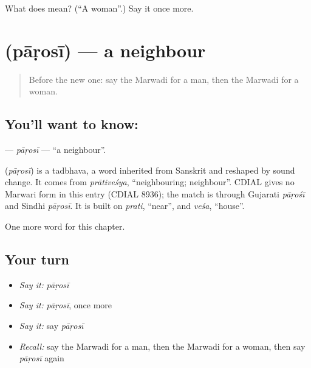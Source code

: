 \begin{tcolorbox}[breakable,colback=teal!4,colframe=teal!35!black,title={Before you move on}]
What does  mean? (\textquotedblleft{}A woman\textquotedblright{}.) Say it once more.
\end{tcolorbox}
\section[\texorpdfstring{\mw{पाड़ोसी} (pāṛosī)}{पाड़ोसी (pāṛosī)}]{ (pāṛosī) — a neighbour}

\label{lesson:MW-C50-parosi}



\begin{quote}
Before the new one: say the Marwadi for a man, then the Marwadi for a woman.
\end{quote}

\subsection*{You'll want to know: }
\textbf{} — \emph{pāṛosī} — \textquotedblleft{}a neighbour\textquotedblright{}.

\begin{cousinweb}
\textbf{} (\emph{pāṛosī}) is a tadbhava, a word inherited from Sanskrit and reshaped by sound change. It comes from \emph{prātiveśya}, \textquotedblleft{}neighbouring; neighbour\textquotedblright{}. CDIAL gives no Marwari form in this entry (CDIAL 8936); the match is through Gujarati \emph{pāṛośī} and Sindhi \emph{pāṛosī}. It is built on \emph{prati}, \textquotedblleft{}near\textquotedblright{}, and \emph{veśa}, \textquotedblleft{}house\textquotedblright{}.
\end{cousinweb}

\begin{grammarlens}[title={What you've built}]
One more word for this chapter.
\end{grammarlens}

\subsection*{Your turn}
\begin{itemize}
\raggedright
  \item \emph{Say it:} \emph{pāṛosī}
  \item \emph{Say it:} \emph{pāṛosī}, once more
  \item \emph{Say it:} say \emph{pāṛosī}
  \item \emph{Recall:} say the Marwadi for a man, then the Marwadi for a woman, then say \emph{pāṛosī} again
\end{itemize}

